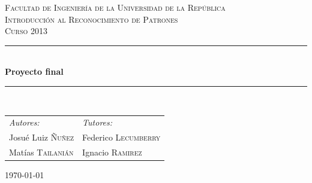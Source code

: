 \documentclass[12pt,a4paper,titlepage]{report}
\newcommand{\HRule}{\rule{\linewidth}{0.5mm}}
\begin{document}
\begin{titlepage}
\begin{center}
\vspace{3cm}
\textsc{\LARGE Facultad de Ingenier\'ia de la Universidad de la Rep\'ublica}\\[1.5cm]
\vspace{2cm}
\textsc{\Large Introducción al Reconocimiento de Patrones  \\[1cm]  Curso 2013}\\[0.5cm]
\vspace{2cm}
\vspace{.7cm}
\HRule \\[1cm]
{ \huge \bfseries Proyecto final}\\[0.4cm]
\HRule \\[1cm]
\vspace{2cm}

\begin{center}
\begin{tabular}{p{}p{}}
\emph{Autores:} & \hfill \emph{Tutores:}\\
Josué Luiz \textsc{Ñuñez} &  \hfill Federico \textsc{Lecumberry}\\
Mat\'ias \textsc{Tailani\'an} & \hfill Ignacio \textsc{Ramirez}
\end{tabular}
\end{center}

\vspace{1cm}

\vfill
\begin{figure} [h!]
\centering
{}\hspace{1cm}
\hspace{1cm}
\end{figure}

{\large \today}
\end{center}
\end{titlepage}
\end{document}
